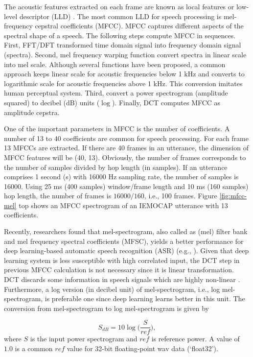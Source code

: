 The acoustic features extracted on each frame are known as local features or
low-level descriptor (LLD) \cite{Herrera1999}. The most common LLD for speech
processing is mel-frequency cepstral coefficients (MFCC). MFCC captures
different aspects of the spectral shape of a speech. The following steps
compute MFCC in sequences. First, FFT/DFT transformed time domain signal into
frequency domain signal (spectra). Second, mel frequency warping function
convert spectra in linear scale into mel scale. Although several functions have
been proposed, a common approach keeps linear scale for acoustic frequencies
below 1 kHz and converts to logarithmic scale for acoustic frequencies above 1
kHz. This conversion imitates human perceptual system. Third, convert a power
spectrogram (amplitude squared) to decibel (dB) units ($\log$). Finally, DCT
computes MFCC as amplitude cepstra.

One of the important parameters in MFCC is the number of coefficients. A number
of 13 to 40 coefficients are common for speech processing. For each frame 13
MFCCs are extracted. If there are 40 frames in an utterance, the dimension of
MFCC features will be (40, 13). Obviously, the number of frames corresponds to
the number of samples divided by hop length (in samples).  If an utterance
comprises 1 second (s) with 16000 Hz sampling rate, the number of samples is
16000. Using 25 ms (400 samples) window/frame length and 10 ms (160 samples)
hop length, the number of frames is $16000/160$, i.e., 100 frames. Figure
\ref{fig:mfcc-mel} top shows an MFCC spectrogram of an IEMOCAP utterance with 13
coefficients.

Recently, researchers found that mel-spectrogram, also called as (mel) filter
bank and mel frequency spectral coefficients (MFSC), yields a better
performance for deep learning-based automatic speech recognition (ASR) (e.g.,
\cite{Mohamed2014}). Given that deep learning system is less susceptible with
high correlated input, the DCT step in previous MFCC calculation is not
necessary since it is linear transformation.  DCT discards some information in
speech signals which are highly non-linear \cite{fayek2016}. Furthermore, a log
version (in decibel unit) of mel-spectrogram, i.e., log mel-spectrogram, is
preferable one since deep learning learns better in this unit. The conversion
from mel-spectrogram to log mel-spectrogram is given by

\begin{equation}
  S_{dB} = 10 \log \biggl( \frac {S}{ref}\biggr),
  \label{eq:log-mel}
\end{equation}
\noindent where $S$ is the input power spectrogram and $ref$ is reference
power. A value of $1.0$ is a common $ref$ value for 32-bit floating-point
wav data (`float32').


